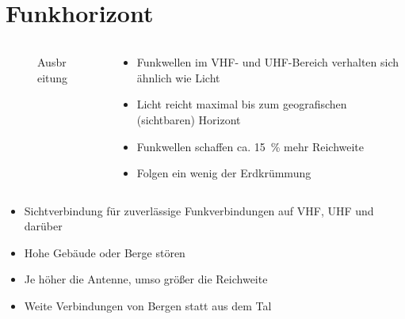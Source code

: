 
\section{Funkhorizont}
\label{section:funkhorizont}
\begin{frame}%

\begin{columns}
    \begin{column}{0.48\textwidth}
    
\begin{figure}
    \caption{\scriptsize Ausbreitung}
    \label{n_funkhorizont}
\end{figure}


    \end{column}
   \begin{column}{0.48\textwidth}
       \begin{itemize}
  \item Funkwellen im VHF- und UHF-Bereich verhalten sich ähnlich wie Licht
  \item Licht reicht maximal bis zum geografischen (sichtbaren) Horizont
  \item Funkwellen schaffen ca. \qty{15}{\percent} mehr Reichweite
  \item Folgen ein wenig der Erdkrümmung
  \end{itemize}

   \end{column}
\end{columns}

\end{frame}

\begin{frame}\begin{itemize}
  \item Sichtverbindung für zuverlässige Funkverbindungen auf VHF, UHF und darüber
  \item Hohe Gebäude oder Berge stören
  \item Je höher die Antenne, umso größer die Reichweite
  \item Weite Verbindungen von Bergen statt aus dem Tal
  \end{itemize}
\end{frame}

\begin{frame}
\end{frame}

